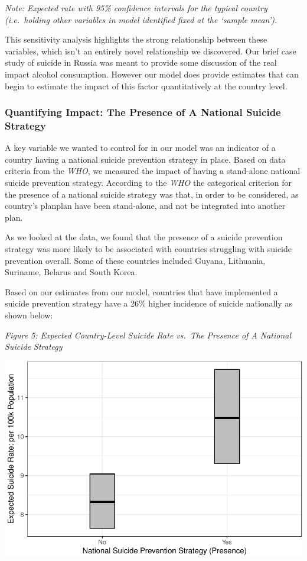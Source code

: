\documentclass[]{article}
\begin{document}
\emph{Note: Expected rate with 95\% confidence intervals for the typical
country (i.e.~holding other variables in model identified fixed at the
`sample mean').}

This sensitivity analysis highlights the strong relationship between
these variables, which isn't an entirely novel relationship we
discovered. Our brief case study of suicide in Russia was meant to
provide some discussion of the real impact alcohol consumption. However
our model does provide estimates that can begin to estimate the impact
of this factor quantitatively at the country level.

\subsubsection{Quantifying Impact: The Presence of A National Suicide
Strategy}\label{quantifying-impact-the-presence-of-a-national-suicide-strategy}

A key variable we wanted to control for in our model was an indicator of
a country having a national suicide prevention strategy in place. Based
on data criteria from the \emph{WHO}, we measured the impact of having a
stand-alone national suicide prevention strategy. According to the
\emph{WHO} the categorical criterion for the presence of a national
suicide strategy was that, in order to be considered, as country's
planplan have been stand-alone, and not be integrated into another plan.

As we looked at the data, we found that the presence of a suicide
prevention strategy was more likely to be associated with countries
struggling with suicide prevention overall. Some of these countries
included Guyana, Lithuania, Suriname, Belarus and South Korea.

Based on our estimates from our model, countries that have implemented a
suicide prevention strategy have a 26\% higher incidence of suicide
nationally as shown below:

\emph{Figure 5: Expected Country-Level Suicide Rate vs.~The Presence of
A National Suicide Strategy}

\begin{center}\includegraphics{Project_Report_files/figure-latex/sstrat_plot-1} \end{center}
\end{document}

